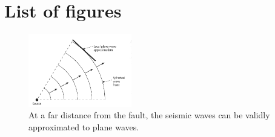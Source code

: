 \chapter{List of figures}
\begin{figure}
    \centering
    \includegraphics[width=0.4\textwidth]{assets/plane.png}
    \caption{At a far distance from the fault, the seismic waves can be validly approximated to plane waves.\cite{stein2009introduction}}
    \label{fig:plane}
\end{figure}
